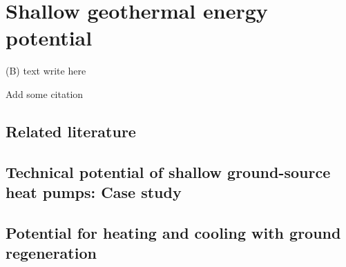 \chapter{Shallow geothermal energy potential}
\label{geothermal}

\vspace{-15pt}
\begin{tcolorbox}[enhanced,width=\textwidth,size=fbox,
        sharp corners,colframe=black!5!white,drop fuzzy shadow southeast] %
(B) text write here

Add some citation
\end{tcolorbox}

\section{Related literature}

\section{Technical potential of shallow ground-source heat pumps: Case study}


\section{Potential for heating and cooling with ground regeneration}